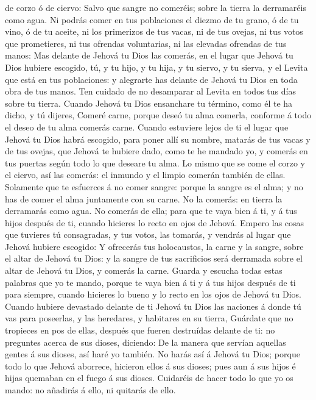 de corzo ó de ciervo:  Salvo que sangre no comeréis; sobre
la tierra la derramaréis como agua.  Ni podrás comer en tus
poblaciones el diezmo de tu grano, ó de tu vino, ó de tu aceite, ni los
primerizos de tus vacas, ni de tus ovejas, ni tus votos que prometieres,
ni tus ofrendas voluntarias, ni las elevadas ofrendas de tus manos:
 Mas delante de Jehová tu Dios las comerás, en el lugar que
Jehová tu Dios hubiere escogido, tú, y tu hijo, y tu hija, y tu siervo,
y tu sierva, y el Levita que está en tus poblaciones: y alegrarte has
delante de Jehová tu Dios en toda obra de tus manos.  Ten
cuidado de no desamparar al Levita en todos tus días sobre tu tierra.
 Cuando Jehová tu Dios ensanchare tu término, como él te ha
dicho, y tú dijeres, Comeré carne, porque deseó tu alma comerla,
conforme á todo el deseo de tu alma comerás carne.  Cuando
estuviere lejos de ti el lugar que Jehová tu Dios habrá escogido, para
poner allí su nombre, matarás de tus vacas y de tus ovejas, que Jehová
te hubiere dado, como te he mandado yo, y comerás en tus puertas según
todo lo que deseare tu alma.  Lo mismo que se come el corzo
y el ciervo, así las comerás: el inmundo y el limpio comerán también de
ellas.  Solamente que te esfuerces á no comer sangre:
porque la sangre es el alma; y no has de comer el alma juntamente con su
carne.  No la comerás: en tierra la derramarás como agua.
 No comerás de ella; para que te vaya bien á ti, y á tus
hijos después de ti, cuando hicieres lo recto en ojos de Jehová.
 Empero las cosas que tuvieres tú consagradas, y tus votos,
las tomarás, y vendrás al lugar que Jehová hubiere escogido:
 Y ofrecerás tus holocaustos, la carne y la sangre, sobre
el altar de Jehová tu Dios: y la sangre de tus sacrificios será
derramada sobre el altar de Jehová tu Dios, y comerás la carne.
 Guarda y escucha todas estas palabras que yo te mando,
porque te vaya bien á ti y á tus hijos después de ti para siempre,
cuando hicieres lo bueno y lo recto en los ojos de Jehová tu Dios.
 Cuando hubiere devastado delante de ti Jehová tu Dios las
naciones á donde tú vas para poseerlas, y las heredares, y habitares en
su tierra,  Guárdate que no tropieces en pos de ellas,
después que fueren destruídas delante de ti: no preguntes acerca de sus
dioses, diciendo: De la manera que servían aquellas gentes á sus dioses,
así haré yo también.  No harás así á Jehová tu Dios; porque
todo lo que Jehová aborrece, hicieron ellos á sus dioses; pues aun á sus
hijos é hijas quemaban en el fuego á sus dioses.  Cuidaréis
de hacer todo lo que yo os mando: no añadirás á ello, ni quitarás de
ello.

